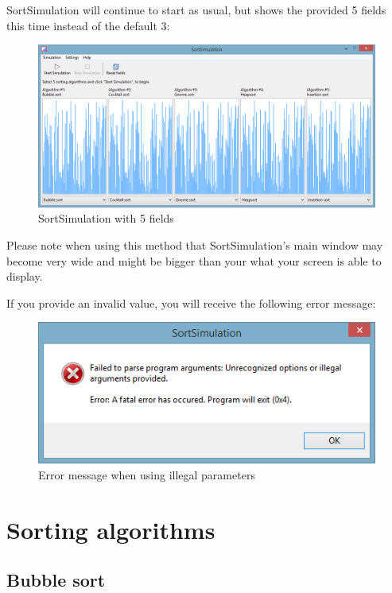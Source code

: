 \documentclass[nobranding]{pfBook}
\begin{document}
	SortSimulation will continue to start as usual, but shows the provided 5 fields this time instead of the default 3:
	
	\begin{figure}[h]
		\centering
		\includegraphics[scale=0.6]{images/image2.png}
		\caption{SortSimulation with 5 fields}
		\label{fig:5fields}
	\end{figure}
	
	Please note when using this method that SortSimulation's main window may become very wide and might be bigger than your what your screen is able to display.
	
	If you provide an invalid value, you will receive the following error message:
	
	\begin{figure}[h]
		\centering
		\includegraphics[scale=0.6]{images/image3.png}
		\caption{Error message when using illegal parameters}
		\label{fig:parameterserror}
	\end{figure}
	
	\section{Sorting algorithms}
	
	\subsection{Bubble sort}
	
\end{document}
